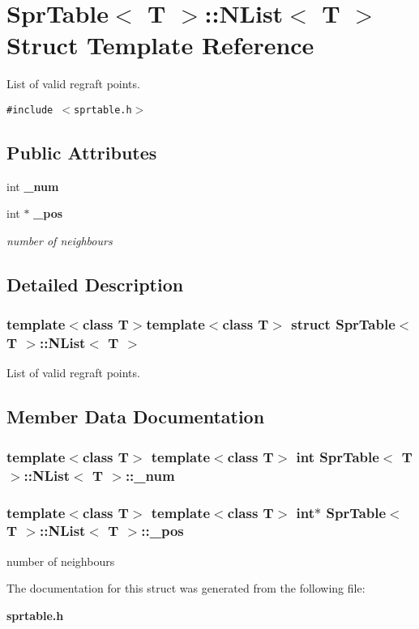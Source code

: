 \section{Spr\-Table$<$ T $>$::NList$<$ T $>$ Struct Template Reference}
\label{structSprTable_1_1NList}
List of valid regraft points.  


{\tt \#include $<$sprtable.h$>$}

\subsection*{Public Attributes}
\begin{CompactItemize}
\item 
int {\bf \_\-num}
\item 
int $\ast$ {\bf \_\-pos}
\begin{CompactList}\small\item\em number of neighbours \item\end{CompactList}\end{CompactItemize}


\subsection{Detailed Description}
\subsubsection*{template$<$class T$>$template$<$class T$>$ struct Spr\-Table$<$ T $>$::NList$<$ T $>$}

List of valid regraft points. 



\subsection{Member Data Documentation}
\subsubsection{\setlength{\rightskip}{0pt plus 5cm}template$<$class T$>$ template$<$class T$>$ int {\bf Spr\-Table}$<$ T $>$::{\bf NList}$<$ T $>$::{\bf \_\-num}}\label{structSprTable_1_1NList_o0}


\subsubsection{\setlength{\rightskip}{0pt plus 5cm}template$<$class T$>$ template$<$class T$>$ int$\ast$ {\bf Spr\-Table}$<$ T $>$::{\bf NList}$<$ T $>$::{\bf \_\-pos}}\label{structSprTable_1_1NList_o1}


number of neighbours 



The documentation for this struct was generated from the following file:\begin{CompactItemize}
\item 
{\bf sprtable.h}\end{CompactItemize}
